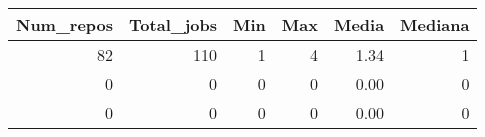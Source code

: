 \begin{tabular}{rrrrrr}
\toprule
 Num\_repos &  Total\_jobs &  Min &  Max &  Media &  Mediana \\
\midrule
        82 &         110 &    1 &    4 &   1.34 &        1 \\
         0 &           0 &    0 &    0 &   0.00 &        0 \\
         0 &           0 &    0 &    0 &   0.00 &        0 \\
\bottomrule
\end{tabular}
